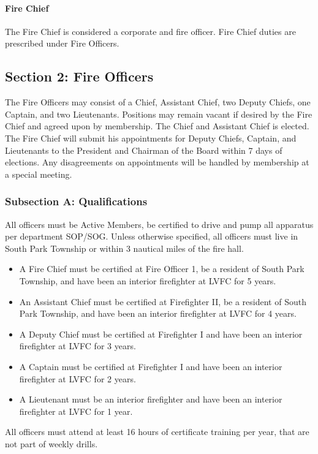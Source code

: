 ﻿\documentclass[12pt,letterpaper]{article}
\begin{document}
\paragraph{Fire Chief}
The Fire Chief is considered a corporate and fire officer.  Fire Chief duties are prescribed under Fire Officers.

\subsection*{Section 2: Fire Officers}
The Fire Officers may consist of a Chief, Assistant Chief, two Deputy Chiefs, one Captain, and two Lieutenants.  Positions may remain vacant if desired by the Fire Chief and agreed upon by membership.  The Chief and Assistant Chief is elected.  The Fire Chief will submit his appointments for Deputy Chiefs, Captain, and Lieutenants to the President and Chairman of the Board within 7 days of elections.  Any disagreements on appointments will be handled by membership at a special meeting.

\subsubsection*{Subsection A: Qualifications}
All officers must be Active Members, be certified to drive and pump all apparatus per department SOP/SOG.  Unless otherwise specified, all officers must live in South Park Township or within 3 nautical miles of the fire hall.
\begin{itemize}
\item A Fire Chief must be certified at Fire Officer 1, be a resident of South Park Township, and have been an interior firefighter at LVFC for 5 years.
\item An Assistant Chief must be certified at Firefighter II, be a resident of South Park Township, and have been an interior firefighter at LVFC for 4 years.
\item A Deputy Chief must be certified at Firefighter I and have been an interior firefighter at LVFC for 3 years.
\item A Captain must be certified at Firefighter I and have been an interior firefighter at LVFC for 2 years.
\item A Lieutenant must be an interior firefighter and have been an interior firefighter at LVFC for 1 year.
\end{itemize}

All officers must attend at least 16 hours of certificate training per year, that are not part of weekly drills.
\end{document}

